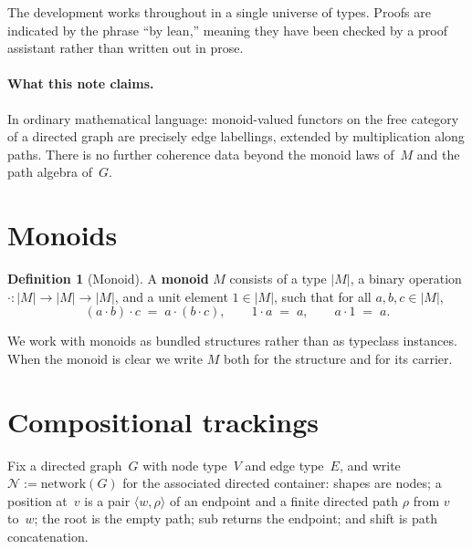 \documentclass[11pt,a4paper]{article}
\theoremstyle{plain}
\theoremstyle{definition}
\newtheorem{definition}[theorem]{Definition}
\begin{document}
The development works throughout in a single universe of types. Proofs are
indicated by the phrase ``by lean,'' meaning they have been checked by a proof
assistant rather than written out in prose.

\paragraph{What this note claims.}
In ordinary mathematical language: monoid-valued functors on the free category
of a directed graph are precisely edge labellings, extended by multiplication
along paths. There is no further coherence data beyond the monoid laws of~$M$
and the path algebra of~$G$.

\section{Monoids}

\begin{definition}[Monoid]\label{def:monoid}
A \textbf{monoid} $M$ consists of a type $\lvert M\rvert$, a binary operation
$\cdot : \lvert M\rvert \to \lvert M\rvert \to \lvert M\rvert$, and a unit
element $1 \in \lvert M\rvert$, such that for all $a,b,c \in \lvert M\rvert$,
\begin{equation}
  (a \cdot b) \cdot c \;=\; a \cdot (b \cdot c),
  \qquad
  1 \cdot a \;=\; a,
  \qquad
  a \cdot 1 \;=\; a.
\end{equation}
\end{definition}

We work with monoids as bundled structures rather than as typeclass instances.
When the monoid is clear we write $M$ both for the structure and for its
carrier.

\section{Compositional trackings}

Fix a directed graph~$G$ with node type~$V$ and edge type~$E$, and write
$\mathcal{N} := \mathrm{network}(G)$ for the associated directed container:
shapes are nodes; a position at~$v$ is a pair $\langle w,\rho \rangle$ of an
endpoint and a finite directed path $\rho$ from $v$ to~$w$; the root is the
empty path; sub returns the endpoint; and shift is path concatenation.
\end{document}

